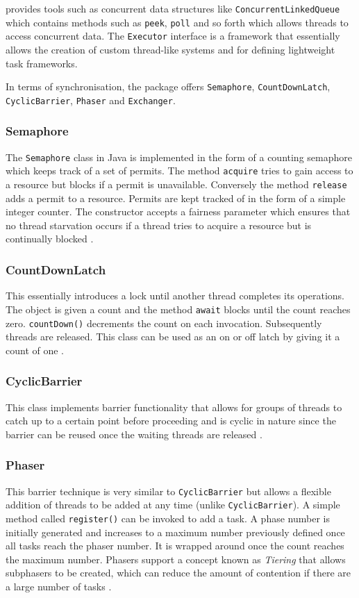 \documentclass[12pt,a4paper,oneside]{article}
\def\code#1{\texttt{#1}}
\begin{document}
    \cite{JavaAPI} provides tools such as concurrent data structures like  \code{ConcurrentLinkedQueue} which contains methods such as \code{peek}, \code{poll} and so forth which allows threads to access concurrent data. The \code{Executor} interface is a framework that essentially allows the creation of custom thread-like systems and for defining lightweight task frameworks.

    In terms of synchronisation, the package offers \code{Semaphore}, \code{CountDownLatch}, \code{CyclicBarrier}, \code{Phaser} and \code{Exchanger}.

    \subsubsection{Semaphore}
      The \code{Semaphore} class in Java is implemented in the form of a counting semaphore which keeps track of a set of permits. The method \code{acquire} tries to gain access to a resource but blocks if a permit is unavailable. Conversely the method \code{release} adds a permit to a resource. Permits are kept tracked of in the form of a simple integer counter. The constructor accepts a fairness parameter which ensures that no thread starvation occurs if a thread tries to acquire a resource but is continually blocked \citep{JavaAPI}.

    \subsubsection{CountDownLatch}
      This essentially introduces a lock until another thread completes its operations. The object is given a count and the method \code{await} blocks until the count reaches zero. \code{countDown()} decrements the count on each invocation. Subsequently threads are released. This class can be used as an on or off latch by giving it a count of one \citep{JavaAPI}.

    \subsubsection{CyclicBarrier}
      This class implements barrier functionality that allows for groups of threads to catch up to a certain point before proceeding and is cyclic in nature since the barrier can be reused once the waiting threads are released \citep{JavaAPI}.

    \subsubsection{Phaser}
      This barrier technique is very similar to \code{CyclicBarrier} but allows a flexible addition of threads to be added at any time (unlike \code{CyclicBarrier}). A simple method called \code{register()} can be invoked to add a task. A phase number is initially generated and increases to a maximum number previously defined once all tasks reach the phaser number. It is wrapped around once the count reaches the maximum number. Phasers support a concept known as \textit{Tiering} that allows subphasers to be created, which can reduce the amount of contention if there are a large number of tasks \cite{JavaAPI}.
\end{document}
